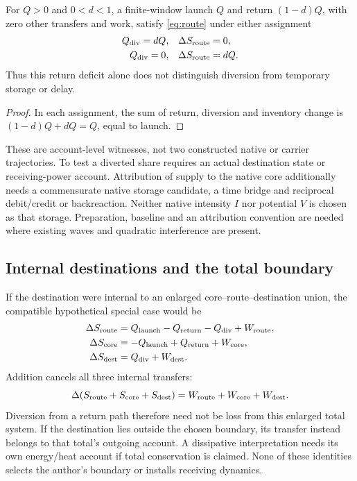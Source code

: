 \begin{proposition}\label{prop:deficit}
For $Q>0$ and $0<d<1$, a finite-window launch $Q$ and return $(1-d)Q$, with zero other transfers and work, satisfy \eqref{eq:route} under either assignment
\begin{align}
 Q_{\rm div}=dQ,\quad &\Delta S_{\rm route}=0,\label{eq:divwitness}\\
 Q_{\rm div}=0,\quad &\Delta S_{\rm route}=dQ.\label{eq:storewitness}
\end{align}
Thus this return deficit alone does not distinguish diversion from temporary storage or delay.
\end{proposition}
\begin{proof}
In each assignment, the sum of return, diversion and inventory change is $(1-d)Q+dQ=Q$, equal to launch.
\end{proof}
These are account-level witnesses, not two constructed native or carrier trajectories. To test a diverted share requires an actual destination state or receiving-power account. Attribution of supply to the native core additionally needs a commensurate native storage candidate, a time bridge and reciprocal debit/credit or backreaction. Neither native intensity $I$ nor potential $V$ is chosen as that storage. Preparation, baseline and an attribution convention are needed where existing waves and quadratic interference are present.

\subsection{Internal destinations and the total boundary}\label{sec:internal}
If the destination were internal to an enlarged core--route--destination union, the compatible hypothetical special case would be
\begin{align}
 \Delta S_{\rm route}&=Q_{\rm launch}-Q_{\rm return}-Q_{\rm div}
                         +W_{\rm route},\label{eq:internalroute}\\
 \Delta S_{\rm core}&=-Q_{\rm launch}+Q_{\rm return}+W_{\rm core},
                         \label{eq:internalcore}\\
 \Delta S_{\rm dest}&=Q_{\rm div}+W_{\rm dest}.\label{eq:internaldest}
\end{align}
Addition cancels all three internal transfers:
\begin{equation}\label{eq:union}
 \Delta(S_{\rm route}+S_{\rm core}+S_{\rm dest})
 =W_{\rm route}+W_{\rm core}+W_{\rm dest}.
\end{equation}
Diversion from a return path therefore need not be loss from this enlarged total system. If the destination lies outside the chosen boundary, its transfer instead belongs to that total's outgoing account. A dissipative interpretation needs its own energy/heat account if total conservation is claimed. None of these identities selects the author's boundary or installs receiving dynamics.

